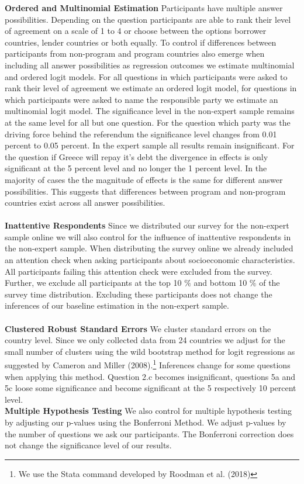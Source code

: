 \textbf{Ordered and Multinomial Estimation}
Participants have multiple answer possibilities. Depending on the question participants are able to rank their level of agreement on a scale of 1 to 4 or choose between the options borrower countries, lender countries or both equally. To control if differences between participants from non-program and program countries also emerge when including all answer possibilities as regression outcomes we estimate multinomial and ordered logit models. For all questions in which participants were asked to rank their level of agreement we estimate an ordered logit model, for questions in which participants were asked to name the responsible party we estimate an multinomial logit model. The significance level in the non-expert sample remains at the same level for all but one question. For the question which party was the driving force behind the referendum the significance level changes from 0.01 percent to 0.05 percent. In the expert sample all results remain insignificant. For the question if Greece will repay it's debt the divergence in effects is only significant at the 5 percent level and no longer the 1 percent level. In the majority of cases the the magnitude of effects is the same for different answer possibilities. This suggests that differences between program and non-program countries exist across all answer possibilities. \\

\\
\textbf{Inattentive Respondents}
Since we distributed our survey for the non-expert sample online we will also control for the influence of inattentive respondents in the non-expert sample. When distributing the survey online we already included an attention check when asking participants about socioeconomic characteristics. All participants failing this attention check were excluded from the survey. Further, we exclude all participants at the top 10 $\%$ and bottom 10 $\%$ of the survey time distribution. Excluding these participants does not change the inferences of our baseline estimation in the non-expert sample.\\


\\
\textbf{Clustered Robust Standard Errors} 
We cluster standard errors on the country level. Since we only collected data from 24 countries we adjust for the small number of clusters using the wild bootstrap method for logit regressions as suggested by Cameron and Miller (2008).\footnote{We use the Stata command developed by Roodman et al. (2018)} Inferences change for some questions when applying this method. Question 2.c becomes insignificant, questions 5a and 5c loose some significance and become significant at the 5 respectively 10 percent level.  \\

\textbf{Multiple Hypothesis Testing}
We also control for multiple hypothesis testing by adjusting our p-values using the Bonferroni Method. We adjust p-values by the number of questions we ask our participants. The Bonferroni correction does not change the significance level of our results. 


